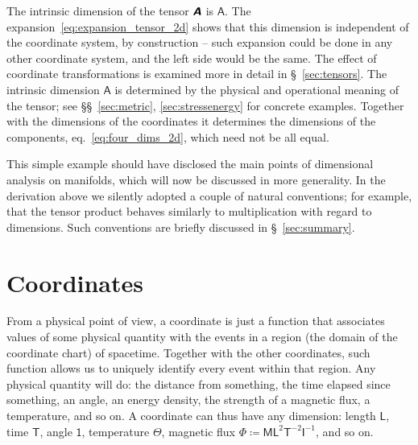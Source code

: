 \documentclass[a4paper,12pt,onecolumn,oneside,article,british]{memoir}
\newcommand*{\mathte}[1]{\textbf{\textit{\textsf{#1}}}}
\newcommand*{\defd}{\coloneqq}
\newcommand*{\sect}{\S}%
\newcommand*{\sects}{\S\S}%
\newcommand*{\eqn}{eq.}%
\newcommand*{\Un}{\textsf{1}}
\newcommand*{\Le}{\textsf{L}}
\newcommand*{\Ti}{\textsf{T}}
\newcommand*{\Ma}{\textsf{M}}
\newcommand*{\Te}{\Theta}
\newcommand*{\Cu}{\textsf{I}}
\newcommand*{\Fl}{\Phi}
\newcommand*{\Aa}{\textsf{A}}
\newcommand*{\yA}{\mathte{A}}
\renewcommand*{\i}{\indices}
\begin{document}
The intrinsic dimension of the tensor $\yA$ is $\Aa$. The
expansion~\eqref{eq:expansion_tensor_2d} shows that this dimension is
independent of the coordinate system, by construction -- such expansion
could be done in any other coordinate system, and the left side would be
the same. The effect of coordinate transformations is examined more in
detail in \sect~\ref{sec:tensors}. The intrinsic dimension $\Aa$ is
determined by the physical and operational meaning of the tensor; see
\sects~\ref{sec:metric}, \ref{sec:stressenergy} for concrete examples.
Together with the dimensions of the coordinates it determines the
dimensions of the components, \eqn~\eqref{eq:four_dims_2d}, which need not
be all equal.

This simple example should have disclosed the main points of dimensional
analysis on manifolds, which will now be discussed in more generality.
In the derivation above we silently adopted a couple of natural
conventions; for example, that the tensor product behaves similarly to
multiplication with regard to dimensions. Such conventions are briefly
discussed in \sect~\ref{sec:summary}.





\section{Coordinates}
\label{sec:coords}

From a physical point of view, a coordinate is just a function that
associates values of some physical quantity with the events in a region
(the domain of the coordinate chart) of spacetime. Together with the other
coordinates, such function allows us to uniquely identify every event
within that region. Any physical quantity will do: the distance from
something, the time elapsed since something, an angle, an energy density,
the strength of a magnetic flux, a temperature, and so on. A coordinate can
thus have any dimension: length $\Le$, time $\Ti$, angle $\Un$, temperature
$\Te$, magnetic flux $\Fl \defd \Ma\Le^{2}\Ti^{-2}\Cu^{-1}$, and so on.
\end{document}
